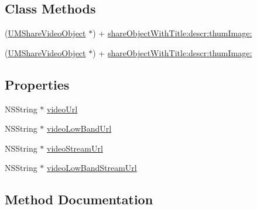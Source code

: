\subsection*{Class Methods}
\begin{DoxyCompactItemize}
\item 
(\mbox{\hyperlink{interface_u_m_share_video_object}{U\+M\+Share\+Video\+Object}} $\ast$) + \mbox{\hyperlink{interface_u_m_share_video_object_a80b1f45a4353be283a52076f7d440f68}{share\+Object\+With\+Title\+:descr\+:thum\+Image\+:}}
\item 
(\mbox{\hyperlink{interface_u_m_share_video_object}{U\+M\+Share\+Video\+Object}} $\ast$) + \mbox{\hyperlink{interface_u_m_share_video_object_a80b1f45a4353be283a52076f7d440f68}{share\+Object\+With\+Title\+:descr\+:thum\+Image\+:}}
\end{DoxyCompactItemize}
\subsection*{Properties}
\begin{DoxyCompactItemize}
\item 
N\+S\+String $\ast$ \mbox{\hyperlink{interface_u_m_share_video_object_a02aeb6f54d2a0de5ef8023c31a031259}{video\+Url}}
\item 
N\+S\+String $\ast$ \mbox{\hyperlink{interface_u_m_share_video_object_a584618eb90654043196e872a6a2ccbbd}{video\+Low\+Band\+Url}}
\item 
N\+S\+String $\ast$ \mbox{\hyperlink{interface_u_m_share_video_object_a540ba23d9e3ede766a837064fa78dead}{video\+Stream\+Url}}
\item 
N\+S\+String $\ast$ \mbox{\hyperlink{interface_u_m_share_video_object_a9f03af2680758bb79a73d94dd5bf4def}{video\+Low\+Band\+Stream\+Url}}
\end{DoxyCompactItemize}


\subsection{Method Documentation}
\mbox{\label{interface_u_m_share_video_object_a80b1f45a4353be283a52076f7d440f68}} 
